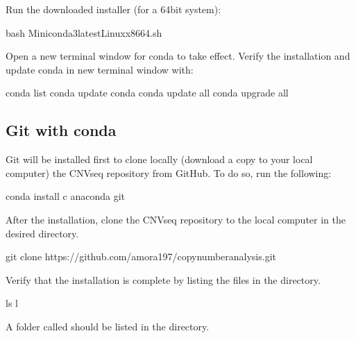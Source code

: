 \documentclass[letterpaper,10pt,english]{sphinxhowto}
\begin{document}
\sphinxAtStartPar
Run the downloaded installer (for a 64\sphinxhyphen{}bit system):

\begin{sphinxVerbatim}[commandchars=\\\{\}]
\PYGZdl{} bash Miniconda3\PYGZhy{}latest\PYGZhy{}Linux\PYGZhy{}x86\PYGZus{}64.sh
\end{sphinxVerbatim}

\sphinxAtStartPar
Open a new terminal window for conda to take effect. Verify the installation and update conda in new terminal window with:

\begin{sphinxVerbatim}[commandchars=\\\{\}]
\PYGZdl{} conda list
\PYGZdl{} conda update conda
\PYGZdl{} conda update \PYGZhy{}\PYGZhy{}all
\PYGZdl{} conda upgrade \PYGZhy{}\PYGZhy{}all
\end{sphinxVerbatim}


\subsection{Git with conda}
\label{\detokenize{index:git-with-conda}}
\sphinxAtStartPar
Git will be installed first to clone locally (download a copy to your local computer) the CNV\sphinxhyphen{}seq repository from GitHub. To do so, run the following:

\begin{sphinxVerbatim}[commandchars=\\\{\}]
\PYGZdl{} conda install \PYGZhy{}c anaconda git
\end{sphinxVerbatim}

\sphinxAtStartPar
After the installation, clone the CNV\sphinxhyphen{}seq repository to the local computer in the desired directory.

\begin{sphinxVerbatim}[commandchars=\\\{\}]
\PYGZdl{} git clone https://github.com/amora197/copy\PYGZhy{}number\PYGZhy{}analysis.git
\end{sphinxVerbatim}

\sphinxAtStartPar
Verify that the installation is complete by listing the files in the directory.

\begin{sphinxVerbatim}[commandchars=\\\{\}]
\PYGZdl{} ls \PYGZhy{}l
\end{sphinxVerbatim}

\sphinxAtStartPar
A folder called  should be listed in the directory.
\end{document}
